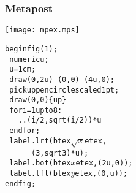 \documentclass[nodefaultblocks]{beamer}
\begin{document}
\begin{frame}\frametitle{Metapost}
  \begin{minipage}{0.3\linewidth}
  \texttt{[image: mpex.mps]}
  \end{minipage}
  \hfill
  \begin{minipage}{0.6\linewidth}
    \small
    \begin{alltt}
beginfig(1);\\
\hspace*{0pt}~ numeric u;\\
\hspace*{0pt}~ u = 1cm;\\
\hspace*{0pt}~ draw (0,2u)---(0,0)---(4u,0);\\
\hspace*{0pt}~ pickup pencircle scaled 1pt;\\
\hspace*{0pt}~ draw (0,0)\{up\}\\
\hspace*{0pt}~ for i=1 upto 8: \\
\hspace*{0pt}~~~  ..(i/2,sqrt(i/2))*u  \\
\hspace*{0pt}~ endfor;\\
\hspace*{0pt}~ label.lrt(btex $\sqrt x$ etex, 
\hspace*{0pt}~ ~ ~ ~ ~ ~ (3,sqrt 3)*u);\\
\hspace*{0pt}~ label.bot(btex $x$ etex, (2u,0));\\
\hspace*{0pt}~ label.lft(btex $y$ etex, (0,u));\\
endfig;\\
    \end{alltt}
  \end{minipage}
\end{frame}
\end{document}
